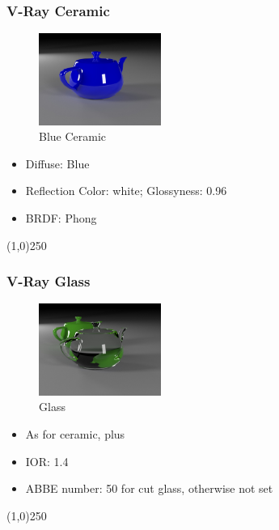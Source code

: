 \begin{frame}
\frametitle{V-Ray Ceramic}
\begin{figure}
	\centering
	\includegraphics[height=3cm]{./Materials/Ceramic}
	\caption{Blue Ceramic}
	\label{fig:BlueCeramic}
\end{figure}
\begin{itemize}
	\item Diffuse: Blue
	\item Reflection Color: white; Glossyness: 0.96 
	\item BRDF: Phong
\end{itemize}
\end{frame}
\begin{center}\line(1,0){250}\end{center}


\begin{frame}
\frametitle{V-Ray Glass}
\begin{figure}
	\centering
	\includegraphics[height=3cm]{./Materials/Glass}
	\caption{Glass}
	\label{fig:Glass}
\end{figure}
\begin{itemize}
	\item As for ceramic, plus
	\item IOR: 1.4
	\item ABBE number: 50 for cut glass, otherwise not set
\end{itemize}
\end{frame}
\begin{center}\line(1,0){250}\end{center}


